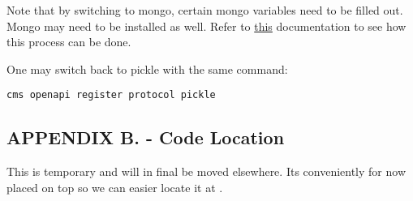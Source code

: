 Note that by switching to mongo, certain mongo variables need to be
filled out. Mongo may need to be installed as well. Refer to
\href{https://github.com/cloudmesh/cloudmesh-openapi/\#installation}{this}
documentation to see how this process can be done.

One may switch back to pickle with the same command:

\begin{verbatim}
cms openapi register protocol pickle
\end{verbatim}

\subsection{APPENDIX B. - Code
Location}\label{appendix-b.---code-location}

This is temporary and will in final be moved elsewhere. Its conveniently
for now placed on top so we can easier locate it at \cite{cloudmesh-openapi}.

